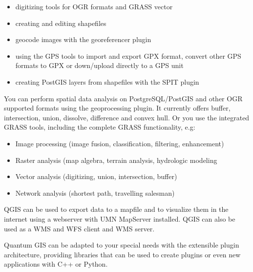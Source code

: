 \begin{itemize}
\item digitizing tools for OGR formats and GRASS vector
\item creating and editing shapefiles
\item geocode images with the georeferencer plugin
\item using the GPS tools to import and export GPX format, convert other GPS
formats to GPX or down/upload directly to a GPS unit
\item creating PostGIS layers from shapefiles with the SPIT plugin 
\end{itemize}


You can perform spatial data analysis on PostgreSQL/PostGIS and other OGR
supported formats using the geoprocessing plugin. It currently offers buffer,
intersection, union, dissolve, difference and convex hull. Or you use the 
integrated GRASS tools, including the complete GRASS functionality, e.g:

\begin{itemize}
\item Image processing (image fusion, classification, filtering, enhancement)
\item Raster analysis (map algebra, terrain analysis, hydrologic modeling
\item Vector analysis (digitizing, union, intersection, buffer)
\item Network analysis (shortest path, travelling salesman)
\end{itemize}


QGIS can be used to export data to a mapfile and to visualize them in the
internet using a webserver with UMN MapServer installed. QGIS can also
be used as a WMS and WFS client and WMS server. 


Quantum GIS can be adapted to your special needs with the extensible
plugin architecture, providing libraries that can be used to create plugins
or even new applications with C++ or Python.     

